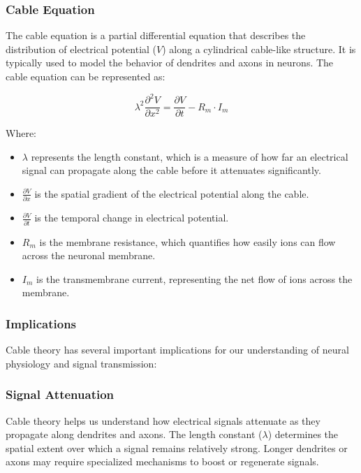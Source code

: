 \documentclass{article}
\begin{document}
\subsubsection{Cable Equation}

The cable equation is a partial differential equation that describes the distribution of electrical potential (\(V\)) along a cylindrical cable-like structure. It is typically used to model the behavior of dendrites and axons in neurons. The cable equation can be represented as:

\[
\lambda^2 \frac{{\partial^2 V}}{{\partial x^2}} = \frac{{\partial V}}{{\partial t}} - R_m \cdot I_m
\]

Where:
\begin{itemize}
  \item \(\lambda\) represents the length constant, which is a measure of how far an electrical signal can propagate along the cable before it attenuates significantly.
  \item \(\frac{{\partial V}}{{\partial x}}\) is the spatial gradient of the electrical potential along the cable.
  \item \(\frac{{\partial V}}{{\partial t}}\) is the temporal change in electrical potential.
  \item \(R_m\) is the membrane resistance, which quantifies how easily ions can flow across the neuronal membrane.
  \item \(I_m\) is the transmembrane current, representing the net flow of ions across the membrane.
\end{itemize}

\subsubsection{Implications}

Cable theory has several important implications for our understanding of neural physiology and signal transmission:

\subsubsection{Signal Attenuation}

Cable theory helps us understand how electrical signals attenuate as they propagate along dendrites and axons. The length constant (\(\lambda\)) determines the spatial extent over which a signal remains relatively strong. Longer dendrites or axons may require specialized mechanisms to boost or regenerate signals.
\end{document}
